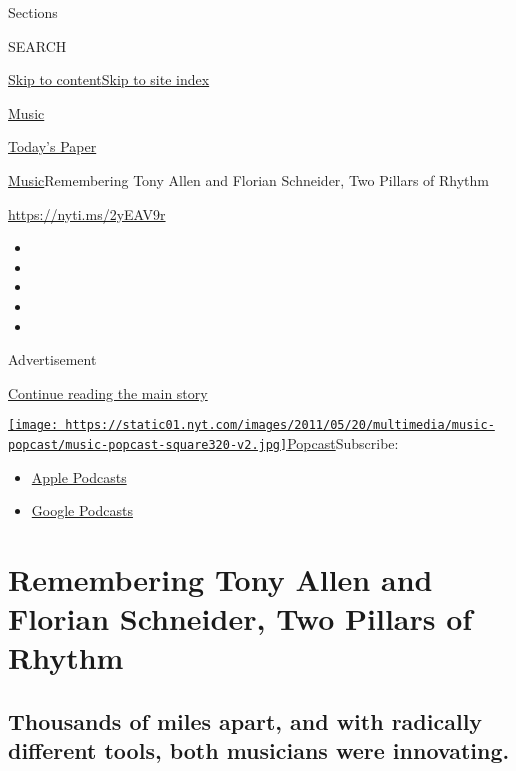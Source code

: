 Sections

SEARCH

\protect\hyperlink{site-content}{Skip to
content}\protect\hyperlink{site-index}{Skip to site index}

\href{https://www.nytimes.com/section/arts/music}{Music}

\href{https://myaccount.nytimes.com/auth/login?response_type=cookie\&client_id=vi}{}

\href{https://www.nytimes.com/section/todayspaper}{Today's Paper}

\href{/section/arts/music}{Music}\textbar{}Remembering Tony Allen and
Florian Schneider, Two Pillars of Rhythm

\url{https://nyti.ms/2yEAV9r}

\begin{itemize}
\item
\item
\item
\item
\item
\end{itemize}

Advertisement

\protect\hyperlink{after-top}{Continue reading the main story}

\href{https://www.nytimes.com/column/popcast-pop-music-podcast}{\texttt{[image: https://static01.nyt.com/images/2011/05/20/multimedia/music-popcast/music-popcast-square320-v2.jpg]}Popcast}Subscribe:

\begin{itemize}
\tightlist
\item
  \href{https://itunes.apple.com/us/podcast/id120315823}{Apple Podcasts}
\item
  \href{https://play.google.com/music/listen?u=0\#/ps/Izaidkcp4ffluag7z7wuzica2su}{Google
  Podcasts}
\end{itemize}

\hypertarget{remembering-tony-allen-and-florian-schneider-two-pillars-of-rhythm}{%
\section{Remembering Tony Allen and Florian Schneider, Two Pillars of
Rhythm}\label{remembering-tony-allen-and-florian-schneider-two-pillars-of-rhythm}}

\hypertarget{thousands-of-miles-apart-and-with-radically-different-tools-both-musicians-were-innovating}{%
\subsection{Thousands of miles apart, and with radically different
tools, both musicians were
innovating.}\label{thousands-of-miles-apart-and-with-radically-different-tools-both-musicians-were-innovating}}

